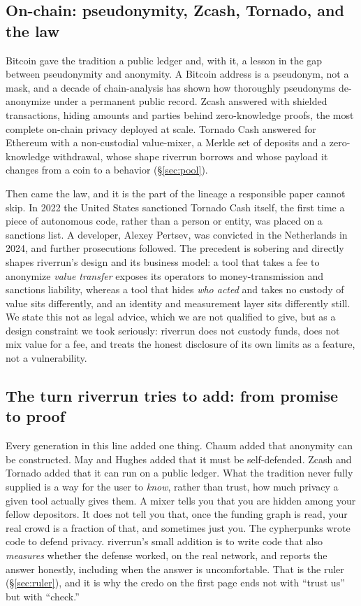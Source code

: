 \documentclass[11pt]{article}
\begin{document}
\subsection{On-chain: pseudonymity, Zcash, Tornado, and the law}

Bitcoin gave the tradition a public ledger and, with it, a lesson in the gap between
pseudonymity and anonymity. A Bitcoin address is a pseudonym, not a mask, and a decade of
chain-analysis has shown how thoroughly pseudonyms de-anonymize under a permanent public
record. Zcash answered with shielded transactions, hiding amounts and parties behind
zero-knowledge proofs, the most complete on-chain privacy deployed at scale. Tornado
Cash answered for Ethereum with a non-custodial value-mixer, a Merkle set of deposits and
a zero-knowledge withdrawal, whose shape riverrun borrows and whose payload it changes
from a coin to a behavior (\S\ref{sec:pool}).

Then came the law, and it is the part of the lineage a responsible paper cannot skip. In
2022 the United States sanctioned Tornado Cash itself, the first time a piece of
autonomous code, rather than a person or entity, was placed on a sanctions list. A
developer, Alexey Pertsev, was convicted in the Netherlands in 2024, and further
prosecutions followed. The precedent is sobering and directly shapes riverrun's design
and its business model: a tool that takes a fee to anonymize \emph{value transfer}
exposes its operators to money-transmission and sanctions liability, whereas a tool that
hides \emph{who acted} and takes no custody of value sits differently, and an identity
and measurement layer sits differently still. We state this not as legal advice, which we
are not qualified to give, but as a design constraint we took seriously: riverrun does
not custody funds, does not mix value for a fee, and treats the honest disclosure of its
own limits as a feature, not a vulnerability.

\subsection{The turn riverrun tries to add: from promise to proof}

Every generation in this line added one thing. Chaum added that anonymity can be
constructed. May and Hughes added that it must be self-defended. Zcash and Tornado added
that it can run on a public ledger. What the tradition never fully supplied is a way for
the user to \emph{know}, rather than trust, how much privacy a given tool actually gives
them. A mixer tells you that you are hidden among your fellow depositors. It does not
tell you that, once the funding graph is read, your real crowd is a fraction of that, and
sometimes just you. The cypherpunks wrote code to defend privacy. riverrun's small
addition is to write code that also \emph{measures} whether the defense worked, on the
real network, and reports the answer honestly, including when the answer is
uncomfortable. That is the ruler (\S\ref{sec:ruler}), and it is why the credo on the
first page ends not with ``trust us'' but with ``check.''
\end{document}
